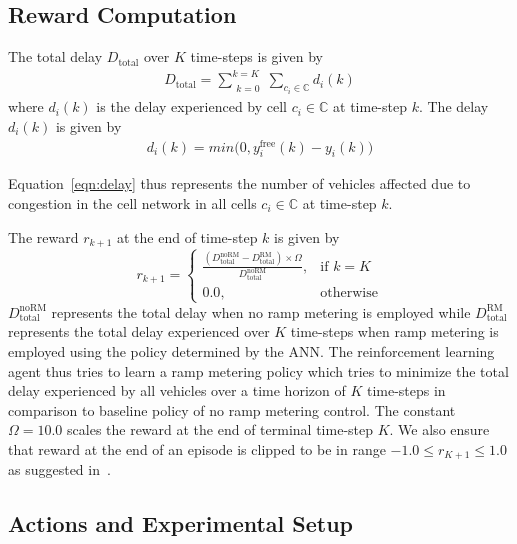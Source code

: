 \documentclass{sig-alternate-05-2015}
\begin{document}
\subsection{Reward Computation}
 The total delay $D_{\text{total}}$ over $K$ time-steps is given by
\begin{align}
D_{\text{total}}=\sum\limits_{\substack{k=0}}^{k=K}\sum\limits_{c_i\in \mathbb{C}}d_i(k)
\end{align}
where $d_i(k)$ is the delay experienced by cell $c_{i} \in \mathbb{C}$ at time-step $k$. The delay $d_i(k)$ is given by
\begin{align}
\label{eqn:delay}
d_i(k)=min\Big(0,y_i^{\text{free}}(k)-y_i(k)\Big)
\end{align}

Equation~\ref{eqn:delay} thus represents the number of vehicles affected due to congestion in the cell network in all cells $c_i\in \mathbb{C}$ at time-step $k$.


The reward $r_{k+1}$ at the end of time-step $k$ is given by
\begin{equation}
r_{k+1}=\begin{cases}
\frac{(D^{\text{noRM}}_{\text{total}}-D^{\text{RM}}_{\text{total}})\times \Omega}{D^{\text{noRM}}_{\text{total}}}, & \text{if } k=K \\
0.0, & \text{otherwise}
\end{cases}
\end{equation}
$D_{\text{total}}^{\text{noRM}}$ represents the total delay when no ramp metering is employed while $D_{\text{total}}^{\text{RM}}$ represents the total delay experienced over $K$ time-steps when ramp metering is employed using the policy determined by the ANN. The reinforcement learning agent thus tries to learn a ramp metering policy which tries to minimize the total delay experienced by all vehicles over a time horizon of $K$ time-steps in comparison to baseline policy of no ramp metering control. The constant $\Omega=10.0$ scales the reward at the end of terminal time-step $K$. We also ensure that reward at the end of an episode is clipped to be in range $-1.0\le r_{K+1}\le 1.0$ as suggested in~\cite{mnih2015human}.



\subsection{Actions and Experimental Setup}
\end{document}
